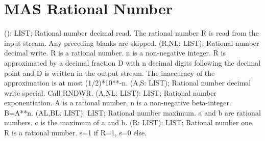 \section{ MAS Rational Number  } 
 (): LIST; \eproc
\bcom Rational number decimal read. The rational number R is read
from the input stream. Any preceding blanks are skipped. \ecom 
{} (R,NL: LIST); \eproc
\bcom Rational number decimal write. R is a rational number. n is a
non-negative integer.  R is approximated by a decimal fraction D with
n decimal digits following the decimal point and D is written in the
output stream.  The inaccuracy of the approximation is at most
(1/2)*10**-n.  \ecom 
{} (A,S: LIST); \eproc
\bcom Rational number decimal write special.
Call RNDWR.  \ecom 
{} (A,NL: LIST): LIST; \eproc
\bcom Rational number exponentiation. A is a rational number,
n is a non-negative beta-integer. B=A**n. \ecom 
{} (AL,BL: LIST): LIST; \eproc
\bcom Rational number maximum. a and b are rational numbers.
c is the maximum of a and b. \ecom 
{} (R: LIST): LIST; \eproc
\bcom Rational number one. R is a rational number. s=1 if R=1,
s=0 else.  \ecom 
